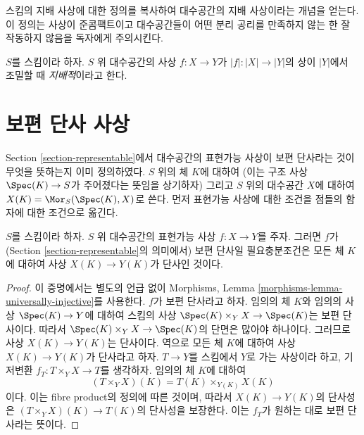 \noindent
스킴의 지배 사상에 대한 정의를 복사하여 대수공간의 지배 사상이라는
개념을 얻는다. 이 정의는 사상이 준콤팩트이고 대수공간들이 어떤
분리 공리를 만족하지 않는 한 잘 작동하지 않음을 독자에게
주의시킨다.

\begin{definition}
\label{definition-dominant}
$S$를 스킴이라 하자. $S$ 위 대수공간의 사상
$f : X \to Y$가 $|f| : |X| \to |Y|$의 상이 $|Y|$에서 조밀할 때
{\it 지배적}이라고 한다.
\end{definition}







\section{보편 단사 사상}
\label{section-universally-injective}

\noindent
Section \ref{section-representable}에서 대수공간의 표현가능 사상이
보편 단사라는 것이 무엇을 뜻하는지 이미 정의하였다. $S$ 위의 체
$K$에 대하여 (이는 구조 사상 $\Spec(K) \to S$가 주어졌다는
뜻임을 상기하자) 그리고 $S$ 위의 대수공간 $X$에 대하여
$X(K) = \Mor_S(\Spec(K), X)$로 쓴다. 먼저 표현가능 사상에 대한
조건을 점들의 함자에 대한 조건으로 옮긴다.

\begin{lemma}
\label{lemma-universally-injective-representable}
$S$를 스킴이라 하자. $S$ 위 대수공간의 표현가능 사상
$f : X \to Y$를 주자. 그러면 $f$가 (Section
\ref{section-representable}의 의미에서) 보편 단사일 필요충분조건은
모든 체 $K$에 대하여 사상 $X(K) \to Y(K)$가 단사인 것이다.
\end{lemma}

\begin{proof}
이 증명에서는 별도의 언급 없이
Morphisms, Lemma \ref{morphisms-lemma-universally-injective}를
사용한다. $f$가 보편 단사라고 하자. 임의의 체 $K$와 임의의
사상 $\Spec(K) \to Y$에 대하여 스킴의 사상
$\Spec(K) \times_Y X \to \Spec(K)$는 보편 단사이다.
따라서 $\Spec(K) \times_Y X \to \Spec(K)$의 단면은 많아야 하나이다.
그러므로 사상 $X(K) \to Y(K)$는 단사이다. 역으로 모든 체 $K$에
대하여 사상 $X(K) \to Y(K)$가 단사라고 하자. $T \to Y$를 스킴에서
$Y$로 가는 사상이라 하고, 기저변환 $f_T : T \times_Y X \to T$를
생각하자. 임의의 체 $K$에 대하여
$$
(T \times_Y X)(K) = T(K) \times_{Y(K)} X(K)
$$
이다. 이는 fibre product의 정의에 따른 것이며, 따라서
$X(K) \to Y(K)$의 단사성은
$(T \times_Y X)(K) \to T(K)$의 단사성을 보장한다. 이는 $f_T$가
원하는 대로 보편 단사라는 뜻이다.
\end{proof}

